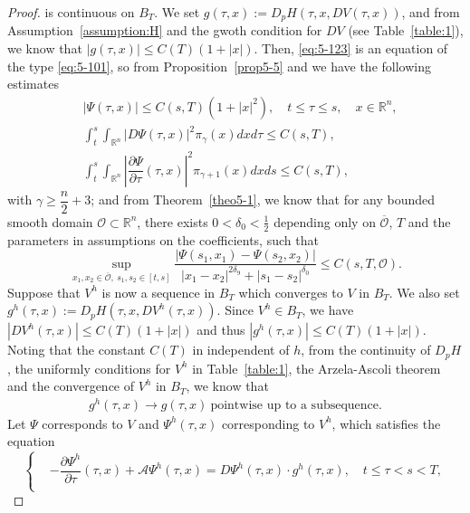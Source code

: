 \documentclass[11pt]{article}
\numberwithin{equation}{section}
\newcommand{\brn}{{\mathbb{R}^n}}
\newcommand{\1}{\mbox{1\hspace{-1mm}I}}
\begin{document}
\begin{proof}
is continuous on $B_{T}$. We set $g(\tau,x):=D_{p}H(\tau,x,DV(\tau,x))$, and from Assumption~\ref{assumption:H} and the gwoth condition for $DV$ (see Table~\ref{table:1}), we know that $|g(\tau,x)|\le C(T)(1+|x|)$. Then, \eqref{eq:5-123} is an equation of the type \eqref{eq:5-101}, so from Proposition~\ref{prop5-5} and  we have the following estimates
\begin{align}
    &|\Psi(\tau,x)|\le C(s,T)(1+|x|^{2}),\quad t\le \tau\leq s, \quad x\in\brn, \label{eq:5-128}\\
    &\int_{t}^{s}\int_{\brn}|D\Psi(\tau,x)|^{2}\pi_{\gamma}(x)dxd\tau\le C(s,T), \label{eq:5-125} \\
    &\int_{t}^{s}\int_{\brn}\left|\dfrac{\partial\Psi}{\partial\tau}(\tau,x)\right|^{2}\pi_{\gamma+1}(x)dxds\le C(s,T), \label{eq:5-126}
\end{align}
with $\gamma\geq\dfrac{n}{2}+3$; and from Theorem~\ref{theo5-1}, we know that for any bounded smooth domain $\mathcal{O}\subset\brn$, there exists $0<\delta_{0}<\frac{1}{2}$ depending only on $\mathcal{\overline{O}}$, $T$ and the parameters in assumptions on the coefficients, such that
\begin{equation}\label{eq:5-127}
    \sup_{x_{1},x_{2}\in\mathcal{\overline{O}},\ s_{1},s_{2}\in[t,s]}\dfrac{|\Psi(s_{1},x_{1})-\Psi(s_{2},x_{2})|}{|x_{1}-x_{2}|^{2\delta_{9}}+|s_{1}-s_{2}|^{\delta_{0}}}\le C(s,T,\mathcal{O}).
\end{equation}
Suppose that $V^{h}$ is now a sequence in $B_{T}$ which converges to $V$ in $B_{T}$. We also set $g^{h}(\tau,x):=D_{p}H\left(\tau,x,DV^{h}(\tau,x)\right)$. Since $V^{h}\in B_{T}$, we have $\left|DV^{h}(\tau,x)\right|\le C(T)\left(1+|x|\right)$ and thus $\left|g^{h}(\tau,x)\right|\le C(T)(1+|x|)$. Noting that the constant $C(T)$ in independent of $h$, from the continuity of $D_pH$, the uniformly conditions for $V^h$ in Table~\ref{table:1}, the Arzela-Ascoli theorem and the convergence of $V^h$ in $B_T$, we know that 
\begin{align}\label{convergence:g}
    g^{h}(\tau,x)\rightarrow g(\tau,x)\ \text{pointwise up to a subsequence}.
\end{align}
Let $\Psi$ corresponds to $V$ and $\Psi^{h}(\tau,x)$ corresponding to $V^{h}$, which satisfies  the equation
\begin{equation}\label{eq:5-180}
\left\{
\begin{aligned}
    &-\dfrac{\partial\Psi^{h}}{\partial\tau}(\tau,x)+\mathcal{A}\Psi^{h}(\tau,x)=D\Psi^{h}(\tau,x)\cdot g^{h}(\tau,x),\quad t\le\tau<s<T,\\

\end{aligned}
\end{equation}
\end{proof}
\end{document}
